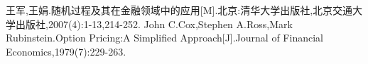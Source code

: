 \begin{thebibliography}{99}
\setlength{\itemsep}{-1mm}
\rm\wuhao 
{}王军,王娟.随机过程及其在金融领域中的应用[M].北京:清华大学出版社,北京交通大学出版社,2007(4):1-13,214-252.
John C.Cox,Stephen A.Ross,Mark Rubinstein.Option Pricing:A Simplified Approach[J].Journal of Financial Economics,1979(7):229-263.

\end{thebibliography}